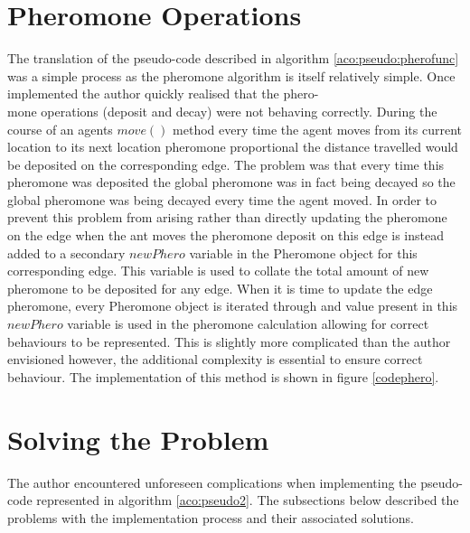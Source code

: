 \section{Pheromone Operations}
The translation of the pseudo-code described in algorithm \ref{aco:pseudo:pherofunc} was a simple process as the pheromone algorithm is itself relatively simple. Once implemented the author quickly realised that the phero-\\mone operations (deposit and decay) were not behaving correctly. During the course of an agents $move()$ method every time the agent moves from its current location to its next location pheromone proportional the distance travelled would be deposited on the corresponding edge. The problem was that every time this pheromone was deposited the global pheromone was in fact being decayed so the global pheromone was being decayed every time the agent moved. In order to prevent this problem from arising rather than directly updating the pheromone on the edge when the ant moves the pheromone deposit on this edge is instead added to a secondary $newPhero$ variable in the Pheromone object for this corresponding edge. This variable is used to collate the total amount of new pheromone to be deposited for any edge. When it is time to update the edge pheromone, every Pheromone object is iterated through and value present in this $newPhero$ variable is used in the pheromone calculation allowing for correct behaviours to be represented. This is slightly more complicated than the author envisioned however, the additional complexity is essential to ensure correct behaviour. The implementation of this method is shown in figure \ref{codephero}.

\section{Solving the Problem}

The author encountered unforeseen complications when implementing the pseudo-code represented in algorithm \ref{aco:pseudo2}. The subsections below described the problems with the implementation process and their associated solutions.

